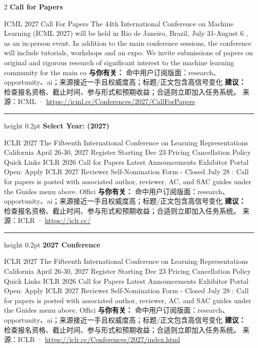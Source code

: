 \documentclass[10.5pt]{ctexart}
\begin{document}
\begin{multicols}{2}
{\large\bfseries Call for Papers}\par
ICML 2027 Call For Papers The 44th International Conference on Machine Learning (ICML 2027) will be held in Rio de Janeiro, Brazil, July 31-August 6 , as an in-person event. In addition to the main conference sessions, the conference will include tutorials, workshops and an expo. We invite submissions of papers on original and rigorous research of significant interest to the machine learning community for the main co
\textbf{与你有关：} 命中用户订阅版面：research、opportunity、ai；来源接近一手且权威度高；标题/正文包含高信号变化
\textbf{建议：} 检查报名资格、截止时间、参与形式和预期收益；合适则立即加入任务系统。
{\footnotesize\color{ormuted} 来源：ICML · \url{https://icml.cc/Conferences/2027/CallForPapers}}
\vspace{2mm}
\hrule height 0.2pt
\vspace{2mm}
{\large\bfseries Select Year: (2027)}\par
ICLR 2027 The Fifteenth International Conference on Learning Representations California April 26-30, 2027 Register Starting Dec 23 Pricing Cancellation Policy Quick Links ICLR 2026 Call for Papers Latest Announcements Exhibitor Portal Open: Apply ICLR 2027 Reviewer Self-Nomination Form - Closed July 28 : Call for papers is posted with associated author, reviewer, AC, and SAC guides under the Guides menu above. Offici
\textbf{与你有关：} 命中用户订阅版面：research、opportunity、ai；来源接近一手且权威度高；标题/正文包含高信号变化
\textbf{建议：} 检查报名资格、截止时间、参与形式和预期收益；合适则立即加入任务系统。
{\footnotesize\color{ormuted} 来源：ICLR · \url{https://iclr.cc/}}
\vspace{2mm}
\hrule height 0.2pt
\vspace{2mm}
{\large\bfseries 2027 Conference}\par
ICLR 2027 The Fifteenth International Conference on Learning Representations California April 26-30, 2027 Register Starting Dec 23 Pricing Cancellation Policy Quick Links ICLR 2026 Call for Papers Latest Announcements Exhibitor Portal Open: Apply ICLR 2027 Reviewer Self-Nomination Form - Closed July 28 : Call for papers is posted with associated author, reviewer, AC, and SAC guides under the Guides menu above. Offici
\textbf{与你有关：} 命中用户订阅版面：research、opportunity、ai；来源接近一手且权威度高；标题/正文包含高信号变化
\textbf{建议：} 检查报名资格、截止时间、参与形式和预期收益；合适则立即加入任务系统。
{\footnotesize\color{ormuted} 来源：ICLR · \url{https://iclr.cc/Conferences/2027/index.html}}

\end{multicols}
\end{document}
